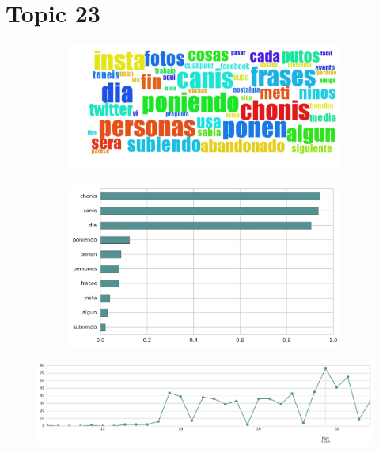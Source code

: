 \section{Topic 23}

\begin{figure}[htbp!]
    \centering
    \begin{subfigure}[b]{0.49\textwidth}
        \includegraphics[width=\textwidth]{twitter_all/report_images/topic-23-wordcloud.jpg}
    \end{subfigure}
    \begin{subfigure}[b]{0.49\textwidth}
        \includegraphics[width=\textwidth]{twitter_all/report_images/topic-23-terms.jpg}
    \end{subfigure}
\end{figure}

\begin{figure}[htbp!]
    \centering
    \includegraphics[width=\textwidth]{twitter_all/report_images/topic-23-timeseries.jpg}
\end{figure}

